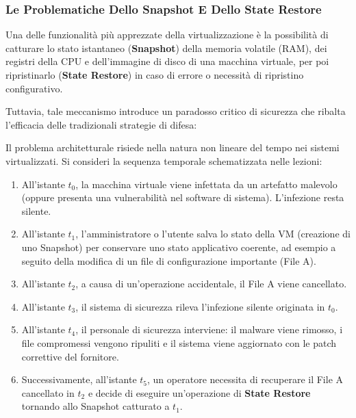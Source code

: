 \documentclass[11pt, a4paper]{article}
\begin{document}
\subsubsection{Le Problematiche Dello Snapshot E Dello State Restore}
Una delle funzionalità più apprezzate della virtualizzazione è la possibilità di catturare lo stato istantaneo (\textbf{Snapshot}) della memoria volatile (RAM), dei registri della CPU e dell'immagine di disco di una macchina virtuale, per poi ripristinarlo (\textbf{State Restore}) in caso di errore o necessità di ripristino configurativo.

Tuttavia, tale meccanismo introduce un paradosso critico di sicurezza che ribalta l'efficacia delle tradizionali strategie di difesa:


Il problema architetturale risiede nella natura non lineare del tempo nei sistemi virtualizzati. Si consideri la sequenza temporale schematizzata nelle lezioni:
\begin{enumerate}
    \item All'istante $t_0$, la macchina virtuale viene infettata da un artefatto malevolo (oppure presenta una vulnerabilità nel software di sistema). L'infezione resta silente.
    \item All'istante $t_1$, l'amministratore o l'utente salva lo stato della VM (creazione di uno Snapshot) per conservare uno stato applicativo coerente, ad esempio a seguito della modifica di un file di configurazione importante (File A).
    \item All'istante $t_2$, a causa di un'operazione accidentale, il File A viene cancellato.
    \item All'istante $t_3$, il sistema di sicurezza rileva l'infezione silente originata in $t_0$.
    \item All'istante $t_4$, il personale di sicurezza interviene: il malware viene rimosso, i file compromessi vengono ripuliti e il sistema viene aggiornato con le patch correttive del fornitore.
    \item Successivamente, all'istante $t_5$, un operatore necessita di recuperare il File A cancellato in $t_2$ e decide di eseguire un'operazione di \textbf{State Restore} tornando allo Snapshot catturato a $t_1$.
\end{enumerate}
\end{document}
